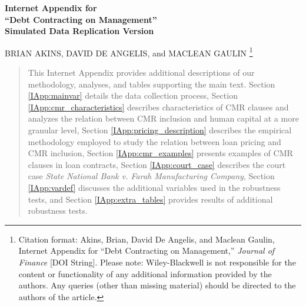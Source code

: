 \documentclass[12pt]{article}
\def \USRVarTitle{Debt Contracting on Management}
\begin{document}
{}



\begin{appendices}

\begin{center}%
{\large \bf Internet Appendix for
\vspace{12pt}
\\ ``\USRVarTitle''
\\ {\normalsize Simulated Data Replication Version}}

\vspace{24pt}

\renewcommand*{\thefootnote}{\fnsymbol{footnote}}

{BRIAN AKINS, DAVID DE ANGELIS, and MACLEAN GAULIN\vspace{-0.05cm}}%
    \footnote{Citation format: Akins, Brian, David De Angelis, and Maclean Gaulin, Internet Appendix for ``\USRVarTitle,'' \emph{Journal of Finance} [DOI String].
    Please note: Wiley-Blackwell is not responsible for the content or functionality of any additional information provided by the authors. Any queries (other than missing material) should be directed to the authors of the article.}
\end{center}

\vspace{12pt}

\renewcommand\abstractname{ }

\begin{abstract}\noindent
This Internet Appendix provides additional descriptions of our methodology, analyses, and tables supporting the main text.
Section \ref{IApp:mainvar} details the data collection process,
Section \ref{IApp:cmr_characteristics} describes characteristics of CMR clauses and analyzes the relation between CMR inclusion and human capital at a more granular level,
Section \ref{IApp:pricing_description} describes the empirical methodology employed to study the relation between loan pricing and CMR inclusion,
Section \ref{IApp:cmr_examples} presents examples of CMR clauses in loan contracts,
Section \ref{IApp:court_case} describes the court case \textit{State National Bank v. Farah Manufacturing Company},
Section \ref{IApp:vardef} discusses the additional variables used in the robustness tests,
and Section \ref{IApp:extra_tables} provides results of additional robustness tests.
\end{abstract}




\end{appendices}
\end{document}
